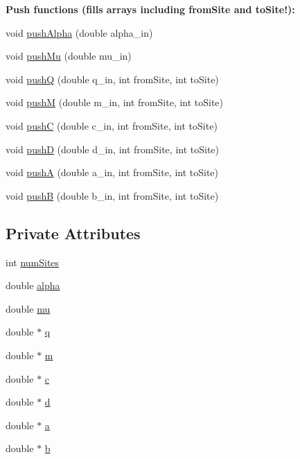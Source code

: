 \begin{Indent}{\bf Push functions (fills arrays including from\+Site and to\+Site!)\+:}\par
\begin{DoxyCompactItemize}
\item 
void \hyperlink{class_p_c_a_1_1_double_well_a8aa1ca5ae0d8ab540aff9693a1c44a0b}{push\+Alpha} (double alpha\+\_\+in)
\item 
void \hyperlink{class_p_c_a_1_1_double_well_ade2e8a266bb471f9283ff0b027b21f2a}{push\+Mu} (double mu\+\_\+in)
\item 
void \hyperlink{class_p_c_a_1_1_double_well_a89131b318ca823892cd9d25d1e4199b5}{pushQ} (double q\+\_\+in, int from\+Site, int to\+Site)
\item 
void \hyperlink{class_p_c_a_1_1_double_well_ab8eae104dc47c3a1a6e36d252b6f48bf}{pushM} (double m\+\_\+in, int from\+Site, int to\+Site)
\item 
void \hyperlink{class_p_c_a_1_1_double_well_ab411ce77646f2241bb358df3c9fd62a8}{pushC} (double c\+\_\+in, int from\+Site, int to\+Site)
\item 
void \hyperlink{class_p_c_a_1_1_double_well_a0ac140e12ed2138343cb0619781e42f2}{pushD} (double d\+\_\+in, int from\+Site, int to\+Site)
\item 
void \hyperlink{class_p_c_a_1_1_double_well_a932ba9e3da3e1542ede92e8853831518}{pushA} (double a\+\_\+in, int from\+Site, int to\+Site)
\item 
void \hyperlink{class_p_c_a_1_1_double_well_a3c939dcf9f2e440d6c213444e638c37c}{pushB} (double b\+\_\+in, int from\+Site, int to\+Site)
\end{DoxyCompactItemize}
\end{Indent}
\subsection*{Private Attributes}
\begin{DoxyCompactItemize}
\item 
int \hyperlink{class_p_c_a_1_1_double_well_a915d7b8dfa8946f1eb7d1ffcd1a85a99}{num\+Sites}
\item 
double \hyperlink{class_p_c_a_1_1_double_well_a658062287cb6dbe6b0827f2dde8e7995}{alpha}
\item 
double \hyperlink{class_p_c_a_1_1_double_well_a5e3a7fa2890eefcc253c6d5a1a554000}{mu}
\item 
double $\ast$ \hyperlink{class_p_c_a_1_1_double_well_a48e5423a6cef47d097a6374ca6745429}{q}
\item 
double $\ast$ \hyperlink{class_p_c_a_1_1_double_well_ac5b001b300ac21e104436d8eecb17d3f}{m}
\item 
double $\ast$ \hyperlink{class_p_c_a_1_1_double_well_aef202905498e58de05d917566c380312}{c}
\item 
double $\ast$ \hyperlink{class_p_c_a_1_1_double_well_a3017cd6c9b0d9e1ce2520468cac5a31f}{d}
\item 
double $\ast$ \hyperlink{class_p_c_a_1_1_double_well_a3304348b0bcb5faa5f9848f88546be36}{a}
\item 
double $\ast$ \hyperlink{class_p_c_a_1_1_double_well_afa6f0d1fbab6c1935dc45d21e5b26a87}{b}
\end{DoxyCompactItemize}



